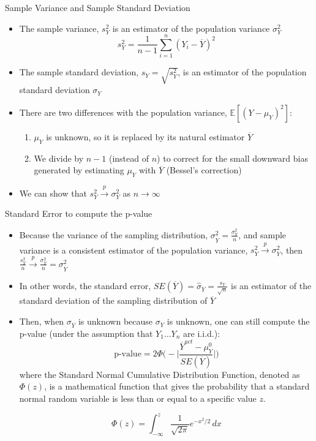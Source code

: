 \documentclass[notes,10pt, aspectratio=169]{beamer}
\begin{document}
\begin{frame}{Sample Variance and Sample Standard Deviation}
\begin{itemize}
    \item The sample variance, $s^2_Y$ is an estimator of the population variance $\sigma^2_Y$
    \begin{equation*}
        s^2_Y = \frac{1}{n-1}\sum_{i=1}^n (Y_i-\overline{Y})^2
    \end{equation*}
    \item The sample standard deviation, $s_Y = \sqrt{s^2_Y}$, is an estimator of the population standard deviation $\sigma_Y$
    \item There are two differences with the population variance, $\mathbb{E}[(Y-\mu_Y)^2]$:
    \begin{enumerate}
        \item $\mu_Y$ is unknown, so it is replaced by its natural estimator $\overline{Y}$
        \item We divide by $n-1$ (instead of $n$) to correct for the small downward bias generated by estimating $\mu_Y$ with $\overline{Y}$ (Bessel's correction)
    \end{enumerate}
    \item We can show that $s_Y^2 \xrightarrow{\mathit{p}}\sigma^2_Y$ as $n\rightarrow\infty$
\end{itemize}
\end{frame}

\begin{frame}{Standard Error to compute the p-value}
\begin{itemize}
    \item Because the variance of the sampling distribution, $\sigma_{\overline{Y}}^2 = \frac{\sigma_Y^2}{n}$, and sample variance is a consistent estimator of the population variance, $s_Y^2 \xrightarrow{\mathit{p}}\sigma^2_Y$, then $\frac{s_Y^2}{n} \xrightarrow{\mathit{p}}\frac{\sigma_Y^2}{n}=\sigma_{\overline{Y}}^2$
    \item In other words, the standard error, $SE(\overline{Y})=\hat{\sigma}_{\overline{Y}}=\frac{s_Y}{\sqrt{n}}$ is an estimator of the standard deviation of the sampling distribution of $\overline{Y}$
    \item Then, when $ \sigma_{\overline{Y}}$ is unknown because $\sigma_Y$ is unknown, one can still compute the p-value (under the assumption that $Y_1\dots Y_n$ are i.i.d.):
    \begin{equation*}
        \text{p-value} = 2\Phi\biggl(-\bigg| \frac{\overline{Y}^{act}-\mu_Y^0}{SE(\overline{Y})}\bigg|\biggl)
    \end{equation*}
    where the Standard Normal Cumulative Distribution Function, denoted as $\Phi(z)$, is a mathematical function that gives the probability that a standard normal random variable is less than or equal to a specific value $z$.

    \begin{equation*}
        \Phi(z) = \int_{-\infty}^{z} \frac{1}{\sqrt{2\pi}} e^{-x^2/2} \, dx
    \end{equation*}
\end{itemize}
\end{frame}
\end{document}
